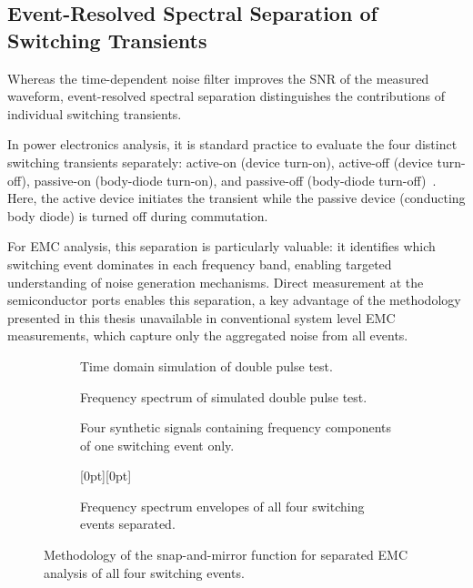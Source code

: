 
\subsection{Event-Resolved Spectral Separation of Switching Transients}
\label{subsec:SpectralSeparation}
Whereas the time-dependent noise filter improves the SNR of the measured waveform, event-resolved spectral separation distinguishes the contributions of individual switching transients.

In power electronics analysis, it is standard practice to evaluate the four distinct switching transients separately: active-on (device turn-on), active-off (device turn-off), passive-on (body-diode turn-on), and passive-off (body-diode turn-off)~\cite{fritz_toward_2020}. 
Here, the active device initiates the transient while the passive device (conducting body diode) is turned off during commutation.

For EMC analysis, this separation is particularly valuable: it identifies which switching event dominates in each frequency band, enabling targeted understanding of noise generation mechanisms. 
Direct measurement at the semiconductor ports enables this separation, a key advantage of the methodology presented in this thesis unavailable in conventional system level EMC measurements, which capture only the aggregated noise from all events.

 \begin{figure}[htb]
	\centering
	\begin{subfigure}{0.48\textwidth}
		\centering
		
		\caption{Time domain simulation of double pulse test.}
	\end{subfigure} %
	\hfill
	\begin{subfigure}{0.48\textwidth}
		\centering
		
		\caption{Frequency spectrum of simulated double pulse test.}
	\end{subfigure} %
	\begin{subfigure}{0.48\textwidth}
		\centering
		
		\caption{Four synthetic signals containing frequency components of one switching event only.}
	\end{subfigure}
	\hfill
	\begin{subfigure}{0.48\textwidth}
		\centering
		\raisebox{-2mm}[0pt][0pt]{}
		\caption{Frequency spectrum envelopes of all four switching events separated.}
	\end{subfigure}
	\caption{Methodology of the snap-and-mirror function for separated EMC analysis of all four switching events.}\label{fig:SnapNMirror}
\end{figure}


